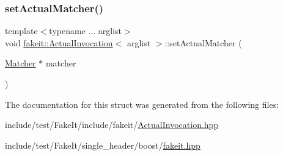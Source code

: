 \subsubsection{\texorpdfstring{setActualMatcher()}{setActualMatcher()}\hspace{0.1cm}{\footnotesize\ttfamily [9/9]}}
{\footnotesize\ttfamily template$<$typename ... arglist$>$ \\
void \mbox{\hyperlink{structfakeit_1_1ActualInvocation}{fakeit\+::\+Actual\+Invocation}}$<$ arglist $>$\+::set\+Actual\+Matcher (\begin{DoxyParamCaption}\item[{\mbox{\hyperlink{structfakeit_1_1ActualInvocation_1_1Matcher}{Matcher}} $\ast$}]{matcher }\end{DoxyParamCaption})\hspace{0.3cm}{\ttfamily [inline]}}



The documentation for this struct was generated from the following files\+:\begin{DoxyCompactItemize}
\item 
include/test/\+Fake\+It/include/fakeit/\mbox{\hyperlink{ActualInvocation_8hpp}{Actual\+Invocation.\+hpp}}\item 
include/test/\+Fake\+It/single\+\_\+header/boost/\mbox{\hyperlink{single__header_2boost_2fakeit_8hpp}{fakeit.\+hpp}}\end{DoxyCompactItemize}
